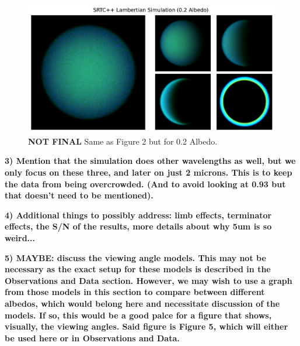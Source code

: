 \documentclass[twocolumn,linenumbers]{aastex631}
\begin{document}
\begin{figure}[htbp]
\includegraphics[scale = 0.4]{LambertianSimA2.pdf}
\centering
\caption{\textbf{\color{red} NOT FINAL \color{black}}Same as Figure 2 but for 0.2 Albedo.}
\label{fig:4}
\end{figure}

\textbf{\color{blue}3) Mention that the simulation does other wavelengths as well, but we only focus on these three, and later on just 2 microns. This is to keep the data from being overcrowded. (And to avoid looking at 0.93 but that doesn't need to be mentioned). \color{black}}
 
 \textbf{\color{blue}4) Additional things to possibly address: limb effects, terminator effects, the S/N of the results, more details about why 5um is so weird... \color{black}}

\textbf{\color{blue}5) MAYBE: discuss the viewing angle models. This may not be necessary as the exact setup for these models is described in the Observations and Data section. However, we may wish to use a graph from those models in this section to compare between different albedos, which would belong here and necessitate discussion of the models. If so, this would be a good palce for a figure that shows, visually, the viewing angles. Said figure is Figure 5, which will either be used here or in Observations and Data.\color{black}}
\end{document}
